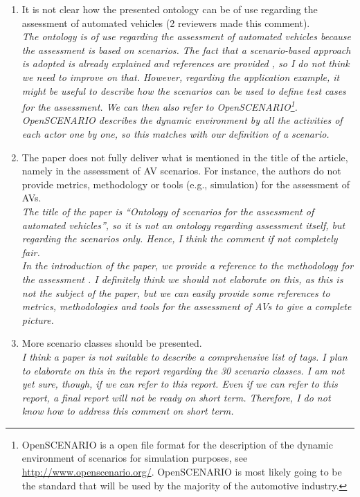 \documentclass[10pt,final,a4paper,oneside,onecolumn]{article}
\begin{document}
\begin{itemize}
\begin{enumerate}
		\item It is not clear how the presented ontology can be of use regarding the assessment of automated vehicles (2 reviewers made this comment).\\
		\textit{The ontology is of use regarding the assessment of automated vehicles because the assessment is based on scenarios. The fact that a scenario-based approach is adopted is already explained and references are provided \cite{stellet2015taxonomy, Helmer2017safety, putz2017pegasus, zofka2015datadrivetrafficscenarios, alvarez2017prospective, aparicio2013pre, lesemann2011test, geyer2014, ulbrich2015, deGelder2017assessment}, so I do not think we need to improve on that. However, regarding the application example, it might be useful to describe how the scenarios can be used to define test cases for the assessment. We can then also refer to OpenSCENARIO\footnote{OpenSCENARIO is a open file format for the description of the dynamic environment of scenarios for simulation purposes, see \url{http://www.openscenario.org/}. OpenSCENARIO is most likely going to be the standard that will be used by the majority of the automotive industry.}. OpenSCENARIO describes the dynamic environment by all the activities of each actor one by one, so this matches with our definition of a scenario.}
		
		\item The paper does not fully deliver what is mentioned in the	title of the article, namely in the assessment of AV	scenarios. For instance, the authors do not provide metrics, methodology or tools (e.g., simulation) for the	assessment of AVs. \\
		\textit{The title of the paper is ``Ontology of scenarios for the assessment of automated vehicles'', so it is not an ontology regarding assessment itself, but regarding the scenarios only. Hence, I think the comment if not completely fair.\\
		In the introduction of the paper, we provide a reference to the methodology for the assessment \cite{stellet2015taxonomy}. I definitely think we should not elaborate on this, as this is not the subject of the paper, but we can easily provide some references to metrics, methodologies and tools for the assessment of AVs to give a complete picture.}
		
		\item More scenario classes should be presented.\\
		\textit{I think a paper is not suitable to describe a comprehensive list of tags. I plan to elaborate on this in the report regarding the 30 scenario classes. I am not yet sure, though, if we can refer to this report. Even if we can refer to this report, a final report will not be ready on short term. Therefore, I do not know how to address this comment on short term.}
		

\end{enumerate}
\end{itemize}
\end{document}

